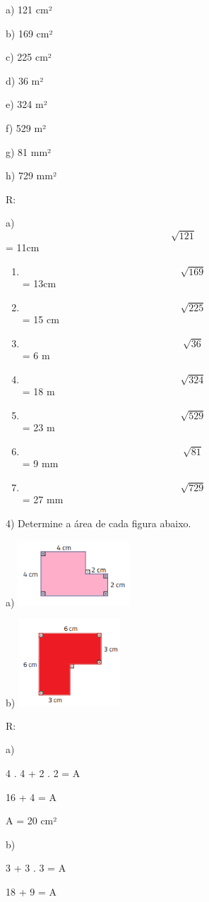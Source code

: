 a) 121 cm²

b) 169 cm²

c) 225 cm²

d) 36 m²

e) 324 m²

f) 529 m²

g) 81 mm²

h) 729 mm²

R:

a) \[\sqrt{121}\] = 11cm

\begin{enumerate}
\def\labelenumi{\alph{enumi})}
\setcounter{enumi}{1}
\item
  \[\ \sqrt{169}\] = 13cm
\item
  \[\ \sqrt{225}\] = 15 cm
\item
  \[\ \sqrt{36}\] = 6 m
\item
  \[\ \sqrt{324}\] = 18 m
\item
  \[\ \sqrt{529}\] = 23 m
\item
  \[\ \sqrt{81}\] = 9 mm
\item
  \[\ \sqrt{729}\] = 27 mm
\end{enumerate}

4) Determine a área de cada figura abaixo.

a)
\includegraphics[width=1.65in,height=0.96458in]{./imgSAEB_8_MAT/media/image43.png}

b)
\includegraphics[width=1.50833in,height=1.28681in]{./imgSAEB_8_MAT/media/image44.png}

R:

a)

4 . 4 + 2 . 2 = A

16 + 4 = A

A = 20 cm²

b)

3 + 3 . 3 = A

18 + 9 = A

